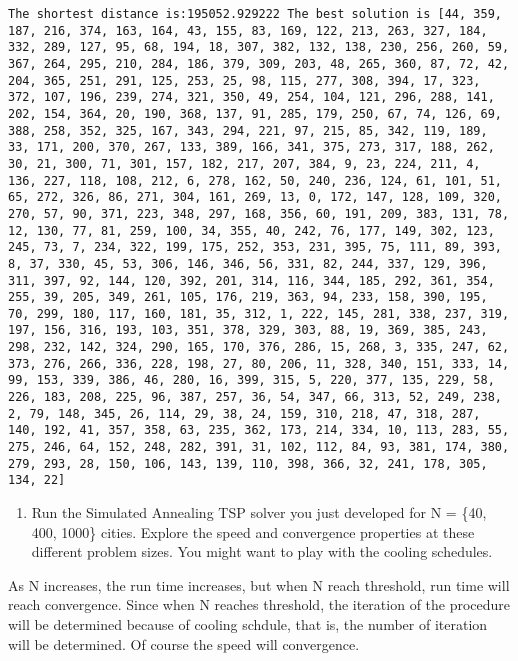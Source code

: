 \documentclass[11pt]{article}
\providecommand{\tightlist}{%
      \setlength{\itemsep}{0pt}\setlength{\parskip}{0pt}}
\begin{document}
    \begin{Verbatim}[commandchars=\\\{\}]
The shortest distance is:195052.929222 The best solution is [44, 359, 187, 216, 374, 163, 164, 43, 155, 83, 169, 122, 213, 263, 327, 184, 332, 289, 127, 95, 68, 194, 18, 307, 382, 132, 138, 230, 256, 260, 59, 367, 264, 295, 210, 284, 186, 379, 309, 203, 48, 265, 360, 87, 72, 42, 204, 365, 251, 291, 125, 253, 25, 98, 115, 277, 308, 394, 17, 323, 372, 107, 196, 239, 274, 321, 350, 49, 254, 104, 121, 296, 288, 141, 202, 154, 364, 20, 190, 368, 137, 91, 285, 179, 250, 67, 74, 126, 69, 388, 258, 352, 325, 167, 343, 294, 221, 97, 215, 85, 342, 119, 189, 33, 171, 200, 370, 267, 133, 389, 166, 341, 375, 273, 317, 188, 262, 30, 21, 300, 71, 301, 157, 182, 217, 207, 384, 9, 23, 224, 211, 4, 136, 227, 118, 108, 212, 6, 278, 162, 50, 240, 236, 124, 61, 101, 51, 65, 272, 326, 86, 271, 304, 161, 269, 13, 0, 172, 147, 128, 109, 320, 270, 57, 90, 371, 223, 348, 297, 168, 356, 60, 191, 209, 383, 131, 78, 12, 130, 77, 81, 259, 100, 34, 355, 40, 242, 76, 177, 149, 302, 123, 245, 73, 7, 234, 322, 199, 175, 252, 353, 231, 395, 75, 111, 89, 393, 8, 37, 330, 45, 53, 306, 146, 346, 56, 331, 82, 244, 337, 129, 396, 311, 397, 92, 144, 120, 392, 201, 314, 116, 344, 185, 292, 361, 354, 255, 39, 205, 349, 261, 105, 176, 219, 363, 94, 233, 158, 390, 195, 70, 299, 180, 117, 160, 181, 35, 312, 1, 222, 145, 281, 338, 237, 319, 197, 156, 316, 193, 103, 351, 378, 329, 303, 88, 19, 369, 385, 243, 298, 232, 142, 324, 290, 165, 170, 376, 286, 15, 268, 3, 335, 247, 62, 373, 276, 266, 336, 228, 198, 27, 80, 206, 11, 328, 340, 151, 333, 14, 99, 153, 339, 386, 46, 280, 16, 399, 315, 5, 220, 377, 135, 229, 58, 226, 183, 208, 225, 96, 387, 257, 36, 54, 347, 66, 313, 52, 249, 238, 2, 79, 148, 345, 26, 114, 29, 38, 24, 159, 310, 218, 47, 318, 287, 140, 192, 41, 357, 358, 63, 235, 362, 173, 214, 334, 10, 113, 283, 55, 275, 246, 64, 152, 248, 282, 391, 31, 102, 112, 84, 93, 381, 174, 380, 279, 293, 28, 150, 106, 143, 139, 110, 398, 366, 32, 241, 178, 305, 134, 22]

    \end{Verbatim}

    \begin{enumerate}
\def\labelenumi{\roman{enumi}.}
\setcounter{enumi}{1}
\tightlist
\item
  Run the Simulated Annealing TSP solver you just developed for N =
  \{40, 400, 1000\} cities. Explore the speed and convergence properties
  at these different problem sizes. You might want to play with the
  cooling schedules.
\end{enumerate}

As N increases, the run time increases, but when N reach threshold, run
time will reach convergence. Since when N reaches threshold, the
iteration of the procedure will be determined because of cooling
schdule, that is, the number of iteration will be determined. Of course
the speed will convergence.


    
    
    
    
\end{document}
